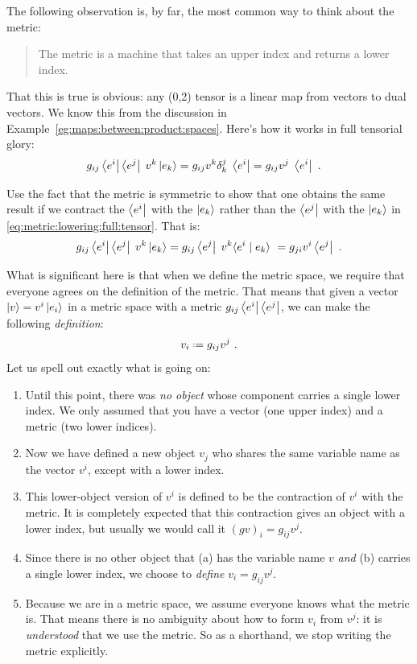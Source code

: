 \documentclass[12pt, oneside]{report}    %
\begin{document}
The following observation is, by far, the most common way to think about the metric:
\begin{quote}
The metric is a machine that takes an upper index and returns a lower index.
\end{quote}
That this is true is obvious: any (0,2) tensor is a linear map from vectors to dual vectors. We know this from the discussion in Example~\ref{eg:maps:between:product:spaces}. Here's how it works in full tensorial glory:
\begin{align}
    g_{ij}\left\langle e^i\right|\left\langle e^j\right| \; v^k \left|e_k\right\rangle
    &= 
    g_{ij}v^k \delta^j_k \; \left\langle e^i\right|
    =
    g_{ij}v^j\; \left\langle e^i\right|
    \ .
    \label{eq:metric:lowering:full:tensor}
\end{align}
\begin{exercise}
Use the fact that the metric is symmetric to show that one obtains the same result if we contract the $\left\langle e^i\right|$ with the $\left|e_k\right\rangle$ rather than the $\left\langle e^j\right|$ with the $\left|e_k\right\rangle$ in \eqref{eq:metric:lowering:full:tensor}. That is:
\begin{align}
    g_{ij}\left\langle e^i\right|\left\langle e^j\right| \; v^k \left|e_k\right\rangle
    = 
    g_{ij}\left\langle e^j\right| \; v^k \langle {e^i}\mid {e_k}\rangle \
    =
    g_{ji}v^i \left\langle e^j\right|
    \ .
\end{align}
\end{exercise}

What is significant here is that when we define the metric space, we require that everyone agrees on the definition of the metric. That means that given a vector $\left|v\right\rangle = v^i\left|e_i\right\rangle$ in a metric space with a metric $g_{ij}\left\langle e^i\right|\left\langle e^j\right|$, we can make the following \emph{definition}:
\begin{align}
    v_i \defeq g_{ij}v^j \ .
\end{align}
Let us spell out exactly what is going on:
\begin{enumerate}
    \item Until this point, there was \emph{no object} whose component carries a single lower index. We only assumed that you have a vector (one upper index) and a metric (two lower indices). 
    \item Now we have defined a new object $v_j$ who shares the same variable name as the vector $v^i$, except with a lower index.
    \item This lower-object version of $v^i$ is defined to be the contraction of $v^i$ with the metric. It is completely expected that this contraction gives an object with a lower index, but usually we would call it $(gv)_i = g_{ij}v^j$.
    \item Since there is no other object that (a) has the variable name $v$ \emph{and} (b) carries a single lower index, we choose to \emph{define} $v_i = g_{ij}v^j$. 
    \item Because we are in a metric space, we assume everyone knows what the metric is. That means there is no ambiguity about how to form $v_i$ from $v^j$: it is \emph{understood} that we use the metric. So as a shorthand, we stop writing the metric explicitly.
\end{enumerate}
\end{document}
